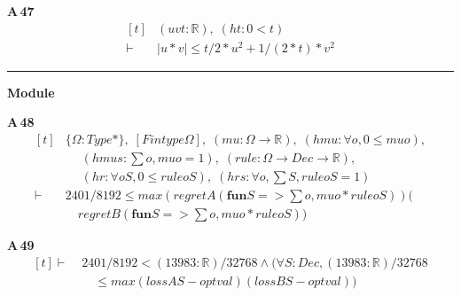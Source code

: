 \noindent\textbf{A\,47}\quad{}
{\footnotesize\[ \begin{aligned}[t]
&(\mathit{u} \mathit{v} \mathit{t} : \mathbb{R} ),\; (\mathit{ht} : 0 < \mathit{t})\\
\vdash\;&|\mathit{u} * \mathit{v}| \leq \mathit{t} / 2 * \mathit{u} ^{2} + 1 / (2 * \mathit{t}) * \mathit{v} ^{2}
\end{aligned} \]}

\vspace{4pt}\noindent\rule{\columnwidth}{0.4pt}\par\vspace{2pt}
\noindent\textbf{Module }\par\vspace{3pt}

\noindent\textbf{A\,48}\quad{}
{\footnotesize\[ \begin{aligned}[t]
&\{ \Omega : \mathit{Type}*\},\; [\mathit{Fintype} \Omega ],\; (\mathit{mu} : \Omega \to \mathbb{R} ),\; (\mathit{hmu} : \forall \mathit{o}, 0 \leq \mathit{mu} \mathit{o}),\\
&\quad \; (\mathit{hmus} : \textstyle\sum \mathit{o}, \mathit{mu} \mathit{o} = 1),\; (\mathit{rule} : \Omega \to \mathit{Dec} \to \mathbb{R} ),\\
&\quad \; (\mathit{hr} : \forall \mathit{o} \mathit{S}, 0 \leq \mathit{rule} \mathit{o} \mathit{S}),\; (\mathit{hrs} : \forall \mathit{o}, \textstyle\sum \mathit{S}, \mathit{rule} \mathit{o} \mathit{S} = 1)\\
\vdash\;&2401/8192 \leq \mathit{max} (\mathit{regretA} (\mathbf{fun} \mathit{S} => \textstyle\sum \mathit{o}, \mathit{mu} \mathit{o}*\mathit{rule} \mathit{o} \mathit{S})) (\\
&\quad \mathit{regretB} (\mathbf{fun} \mathit{S} => \textstyle\sum \mathit{o}, \mathit{mu} \mathit{o}*\mathit{rule} \mathit{o} \mathit{S}))
\end{aligned} \]}

\noindent\textbf{A\,49}\quad{}
{\footnotesize\[ \begin{aligned}[t]
\vdash\;&2401/8192 < (13983:\mathbb{R} )/32768 \wedge (\forall \mathit{S} : \mathit{Dec}, (13983:\mathbb{R} )/32768\\
&\quad \leq \mathit{max} (\mathit{lossA} \mathit{S} - \mathit{optval}) (\mathit{lossB} \mathit{S} - \mathit{optval}))
\end{aligned} \]}

